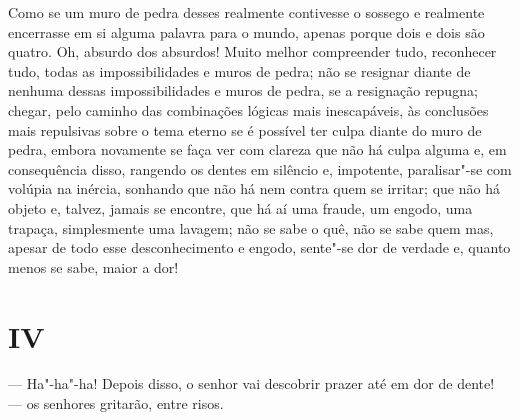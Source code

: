 Como se um muro de pedra desses realmente contivesse o sossego e
realmente encerrasse em si alguma palavra para o mundo, apenas porque
dois e dois são quatro. Oh, absurdo dos absurdos! Muito melhor
compreender tudo, reconhecer tudo, todas as impossibilidades e muros de
pedra; não se resignar diante de nenhuma dessas impossibilidades e muros
de pedra, se a resignação repugna; chegar, pelo caminho das combinações
lógicas mais inescapáveis, às conclusões mais repulsivas sobre o tema
eterno se é possível ter culpa diante do muro de pedra, embora novamente
se faça ver com clareza que não há culpa alguma e, em consequência
disso, rangendo os dentes em silêncio e, impotente, paralisar"-se com
volúpia na inércia, sonhando que não há nem contra quem se irritar; que
não há objeto e, talvez, jamais se encontre, que há aí uma fraude, um
engodo, uma trapaça, simplesmente uma lavagem; não se sabe o quê, não se
sabe quem mas, apesar de todo esse desconhecimento e engodo, sente"-se
dor de verdade e, quanto menos se sabe, maior a dor!

\section{IV}

--- Ha"-ha"-ha! Depois disso, o senhor vai descobrir prazer até em dor de
dente! --- os senhores gritarão, entre risos.

